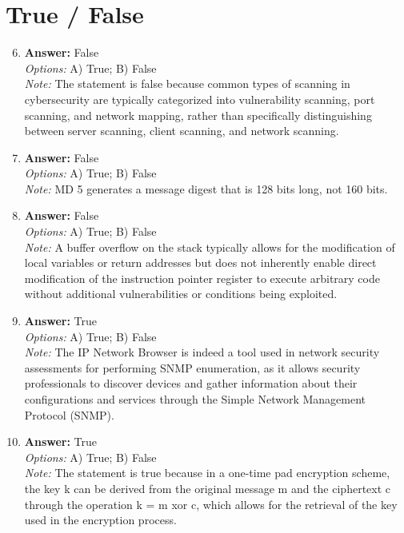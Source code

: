 \documentclass[12pt]{article}
\begin{document}
\section*{True / False}
\begin{enumerate}[label=\arabic*.]
\setcounter{enumi}{5}
\item \textbf{Answer:} False
\\ \textit{Options:} A) True; B) False
\\ \textit{Note:} The statement is false because common types of scanning in cybersecurity are typically categorized into vulnerability scanning, port scanning, and network mapping, rather than specifically distinguishing between server scanning, client scanning, and network scanning.
\item \textbf{Answer:} False
\\ \textit{Options:} A) True; B) False
\\ \textit{Note:} MD 5 generates a message digest that is 128 bits long, not 160 bits.
\item \textbf{Answer:} False
\\ \textit{Options:} A) True; B) False
\\ \textit{Note:} A buffer overflow on the stack typically allows for the modification of local variables or return addresses but does not inherently enable direct modification of the instruction pointer register to execute arbitrary code without additional vulnerabilities or conditions being exploited.
\item \textbf{Answer:} True
\\ \textit{Options:} A) True; B) False
\\ \textit{Note:} The IP Network Browser is indeed a tool used in network security assessments for performing SNMP enumeration, as it allows security professionals to discover devices and gather information about their configurations and services through the Simple Network Management Protocol (SNMP).
\item \textbf{Answer:} True
\\ \textit{Options:} A) True; B) False
\\ \textit{Note:} The statement is true because in a one-time pad encryption scheme, the key k can be derived from the original message m and the ciphertext c through the operation k = m xor c, which allows for the retrieval of the key used in the encryption process.
\end{enumerate}
\end{document}
